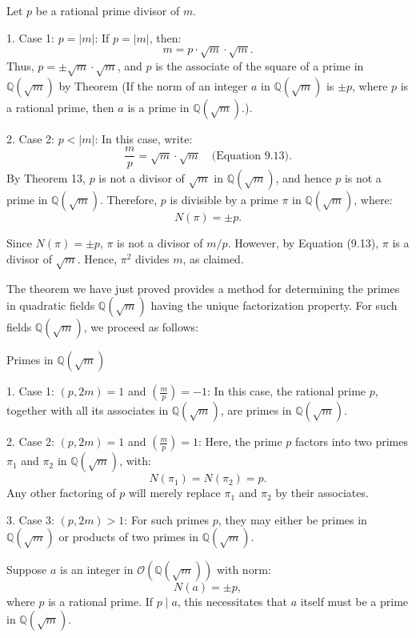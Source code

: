 \documentclass{article}
\newenvironment{proofbox}
  {\begin{mdframed}[linewidth=1pt,linecolor=black,backgroundcolor=white]\noindent\ignorespaces}
  {\end{mdframed}}
\begin{document}
\begin{proofbox}
    Let \( p \) be a rational prime divisor of \( m \).

1. Case 1: \( p = |m| \):
   If \( p = |m| \), then:
   \[
   m = p \cdot \sqrt{m} \cdot \sqrt{m}.
   \]
   Thus, \( p = \pm \sqrt{m} \cdot \sqrt{m} \), and \( p \) is the associate of the square of a prime in \( \mathbb{Q}(\sqrt{m}) \) by Theorem (If the norm of an integer \( a \) in \( \mathbb{Q}(\sqrt{m}) \) is \( \pm p \), where \( p \) is a rational prime, then \( a \) is a prime in \( \mathbb{Q}(\sqrt{m}) \).).

2. Case 2: \( p < |m| \): 
   In this case, write:
   \[
   \frac{m}{p} = \sqrt{m} \cdot \sqrt{m} \quad \text{(Equation 9.13)}.
   \]
   By Theorem 13, \( p \) is not a divisor of \( \sqrt{m} \) in \( \mathbb{Q}(\sqrt{m}) \), and hence \( p \) is not a prime in \( \mathbb{Q}(\sqrt{m}) \). Therefore, \( p \) is divisible by a prime \( \pi \) in \( \mathbb{Q}(\sqrt{m}) \), where:
   \[
   N(\pi) = \pm p.
   \]

   Since \( N(\pi) = \pm p \), \( \pi \) is not a divisor of \( m/p \). However, by Equation (9.13), \( \pi \) is a divisor of \( \sqrt{m} \). Hence, \( \pi^2 \) divides \( m \), as claimed.
\end{proofbox}


The theorem we have just proved provides a method for determining the primes in quadratic fields \( \mathbb{Q}(\sqrt{m}) \) having the unique factorization property. For such fields \( \mathbb{Q}(\sqrt{m}) \), we proceed as follows:

Primes in \( \mathbb{Q}(\sqrt{m}) \)

1. Case 1: \( (p, 2m) = 1 \) and \( \left( \frac{m}{p} \right) = -1 \): 
   In this case, the rational prime \( p \), together with all its associates in \( \mathbb{Q}(\sqrt{m}) \), are primes in \( \mathbb{Q}(\sqrt{m}) \).

2. Case 2: \( (p, 2m) = 1 \) and \( \left( \frac{m}{p} \right) = 1 \):  
   Here, the prime \( p \) factors into two primes \( \pi_1 \) and \( \pi_2 \) in \( \mathbb{Q}(\sqrt{m}) \), with:
   \[
   N(\pi_1) = N(\pi_2) = p.
   \]
   Any other factoring of \( p \) will merely replace \( \pi_1 \) and \( \pi_2 \) by their associates.

3. Case 3: \( (p, 2m) > 1 \):
   For such primes \( p \), they may either be primes in \( \mathbb{Q}(\sqrt{m}) \) or products of two primes in \( \mathbb{Q}(\sqrt{m}) \).


Suppose \( a \) is an integer in \( \mathcal{O}(\mathbb{Q}(\sqrt{m})) \) with norm:
\[
N(a) = \pm p,
\]
where \( p \) is a rational prime. If \( p \mid a \), this necessitates that \( a \) itself must be a prime in \( \mathbb{Q}(\sqrt{m}) \).  
\end{document}
